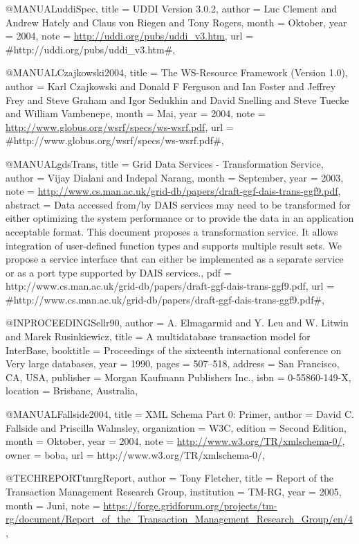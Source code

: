 @MANUAL{uddiSpec,
  title = {{UDDI Version 3.0.2}},
  author = {Luc Clement and Andrew Hately and Claus von Riegen and Tony Rogers},
  month = {Oktober},
  year = {2004},
  note = {\url{http://uddi.org/pubs/uddi_v3.htm}},
  url = {#http://uddi.org/pubs/uddi_v3.htm#},
}

@MANUAL{Czajkowski2004,
  title = {{The WS-Resource Framework (Version 1.0)}},
  author = {Karl Czajkowski and Donald F Ferguson and Ian Foster and Jeffrey
	Frey and Steve Graham and Igor Sedukhin and David Snelling and Steve
	Tuecke and William Vambenepe},
  month = {Mai},
  year = {2004},
  note = {\url{http://www.globus.org/wsrf/specs/ws-wsrf.pdf}},
  url = {#http://www.globus.org/wsrf/specs/ws-wsrf.pdf#},
}

@MANUAL{gdsTrans,
  title = {{Grid Data Services - Transformation Service}},
  author = {Vijay Dialani and Indepal Narang},
  month = {September},
  year = {2003},
  note = {\url{http://www.cs.man.ac.uk/grid-db/papers/draft-ggf-dais-trans-ggf9.pdf}},
  abstract = {Data accessed from/by DAIS services may
need to be transformed for
	either optimizing the system performance
or to provide the data in
	an application acceptable format. This
document proposes a transformation
	service. It allows integration
of user-defined function types and
	supports multiple result sets.
We propose a service interface that
	can either be implemented as
a separate service or as a port type
	supported by DAIS services.},
  pdf = {http://www.cs.man.ac.uk/grid-db/papers/draft-ggf-dais-trans-ggf9.pdf},
  url = {#http://www.cs.man.ac.uk/grid-db/papers/draft-ggf-dais-trans-ggf9.pdf#},
}

@INPROCEEDINGS{ellr90,
  author = {A. Elmagarmid and Y. Leu and W. Litwin and Marek Rusinkiewicz},
  title = {{A multidatabase transaction model for InterBase}},
  booktitle = {Proceedings of the sixteenth international conference on Very large
	databases},
  year = {1990},
  pages = {507--518},
  address = {San Francisco, CA, USA},
  publisher = {Morgan Kaufmann Publishers Inc.},
  isbn = {0-55860-149-X},
  location = {Brisbane, Australia},
}

@MANUAL{Fallside2004,
  title = {{XML Schema Part 0: Primer}},
  author = {David C. Fallside and Priscilla Walmsley},
  organization = {W3C},
  edition = {Second Edition},
  month = {Oktober},
  year = {2004},
  note = {\url{http://www.w3.org/TR/xmlschema-0/}},
  owner = {boba},
  url = {http://www.w3.org/TR/xmlschema-0/},
}

@TECHREPORT{tmrgReport,
  author = {Tony Fletcher},
  title = {{Report of the Transaction Management Research Group}},
  institution = {TM-RG},
  year = {2005},
  month = {Juni},
  note = {\url{https://forge.gridforum.org/projects/tm-rg/document/Report_of_the_Transaction_Management_Research_Group/en/4}},
}

